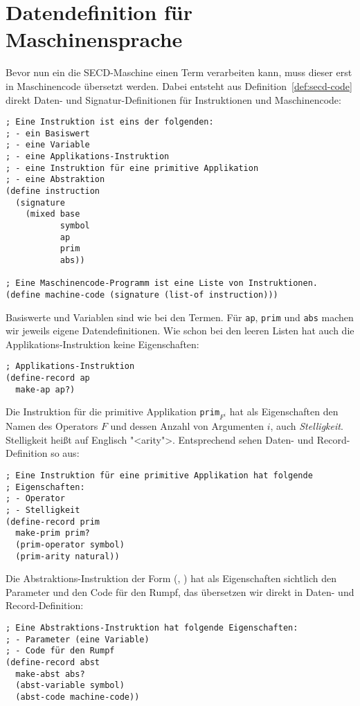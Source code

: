 \section{Datendefinition für Maschinensprache}
% 
Bevor nun ein die SECD-Maschine einen Term verarbeiten kann, muss
dieser erst in Maschinencode übersetzt werden.  Dabei entsteht aus
Definition~\ref{def:secd-code} direkt Daten- und Signatur-Definitionen
für Instruktionen und Maschinencode:
%
\begin{lstlisting}
; Eine Instruktion ist eins der folgenden:
; - ein Basiswert
; - eine Variable
; - eine Applikations-Instruktion
; - eine Instruktion für eine primitive Applikation
; - eine Abstraktion
(define instruction
  (signature
    (mixed base
           symbol
           ap
           prim
           abs))

; Eine Maschinencode-Programm ist eine Liste von Instruktionen.
(define machine-code (signature (list-of instruction)))
\end{lstlisting}
%
Basiswerte und Variablen sind wie bei den Termen.
Für \lstinline{ap}, \lstinline{prim} und \lstinline{abs} machen wir
jeweils eigene Datendefinitionen.
Wie schon bei den leeren Listen hat auch die Applikations-Instruktion
keine Eigenschaften:
%
\begin{lstlisting}
; Applikations-Instruktion
(define-record ap
  make-ap ap?)
\end{lstlisting}
%
Die Instruktion für die primitive Applikation \texttt{prim}$_{F^i}$
hat als Eigenschaften den Namen des Operators $F$ und dessen Anzahl
von Argumenten $i$, auch \textit{Stelligkeit}.
Stelligkeit heißt auf Englisch "<arity">.  Entsprechend sehen Daten-
und Record-Definition so aus:
%
\begin{lstlisting}
; Eine Instruktion für eine primitive Applikation hat folgende
; Eigenschaften:
; - Operator
; - Stelligkeit
(define-record prim
  make-prim prim?
  (prim-operator symbol)
  (prim-arity natural))
\end{lstlisting}
%
Die Abstraktions-Instruktion der Form (, ) hat als
Eigenschaften sichtlich den Parameter und den Code für den Rumpf,
das übersetzen wir direkt in Daten- und Record-Definition:
%
\begin{lstlisting}
; Eine Abstraktions-Instruktion hat folgende Eigenschaften:
; - Parameter (eine Variable)
; - Code für den Rumpf
(define-record abst
  make-abst abs?
  (abst-variable symbol)
  (abst-code machine-code))
\end{lstlisting}

